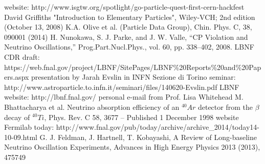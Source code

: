 \begin{thebibliography}{1}
    website: http://www.isgtw.org/spotlight/go-particle-quest-first-cern-hackfest
    David Griffiths "Introduction to Elementary Particles", Wiley-VCH; 2nd edition (October 13, 2008)
    K.A. Olive et al. (Particle Data Group), Chin. Phys. C, 38, 090001 (2014) 
    H. Nunokawa, S. J. Parke, and J. W. Valle, “CP Violation and Neutrino Oscillations,”
Prog.Part.Nucl.Phys., vol. 60, pp. 338–402, 2008.
    LBNF CDR draft: https://web.fnal.gov/project/LBNF/SitePages/LBNF\%20Reports\%20and\%20Papers.aspx
    presentation by Jarah Evslin in INFN Sezione di Torino seminar: http://www.astroparticle.to.infn.it/seminari/files/140620-Evslin.pdf
    LBNF website: http://lbnf.fnal.gov/
    personal e-mail from Prof. Lisa Whitehead
    M. Bhattacharya et al. Neutrino absorption efficiency of an $^{40}Ar$ detector from the $\beta$ decay of $^{40}Ti$, Phys. Rev. C 58, 3677 – Published 1 December 1998
    website Fermilab today: http://www.fnal.gov/pub/today/archive/archive\_2014/today14-10-09.html
    G. J. Feldman, J. Hartnell, T. Kobayashi, A Review of Long-baseline Neutrino Oscillation Experiments, Advances in High Energy Physics 2013 (2013), 475749
\end{thebibliography}
